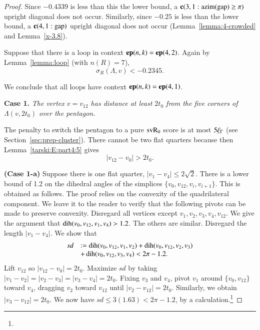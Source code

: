 \begin{proof}
Since $-0.4339$ is less than this the lower bound, a ${\operatorname{\bf c}}{(3,1: {\operatorname{azim}}({\operatorname{gap}}) \ge \pi)}$
upright diagonal does not occur. Similarly, since $-0.25$ is less
than the lower bound, a ${\operatorname{\bf c}}{(4,1:{\operatorname{gap}})}$ upright diagonal does not
occur (Lemma~\ref{lemma:4-crowded} and Lemma~\ref{x-3.8}).

Suppose that there is a loop in context ${\operatorname{\bf ep}}{(n,k)}={\operatorname{\bf ep}}{(4,2)}$. Again by
Lemma~\ref{lemma:loop} (with $n(R)=7$),
$$\sigma_R(\Lambda,v)  < -0.2345.$$


We conclude that all loops have context ${\operatorname{\bf ep}}{(n,k)}={\operatorname{\bf ep}}{(4,1)}$.


{\bf Case 1.}  {\it The vertex $v=v_{12}$ has distance at least
$2t_0$ from the five corners of $\Lambda(v,2t_0)$ over the pentagon.}


The penalty to switch the pentagon to a pure ${\operatorname{svR}}_0$ score is at
most $5\xi_\Gamma$ (see Section~\ref{sec:prep-cluster}).  There cannot
be two flat quarters because then Lemma~\ref{tarski:E:part4:5} gives
$$|v_{12}-v_0|>2t_0.$$


{\bf (Case 1-a)} Suppose there is one flat quarter,
$|v_1-v_4|\le2\sqrt2$. There is a lower bound of 1.2 on the
dihedral angles of the simplices $\{v_0,v_{12},v_i,v_{i+1}\}$.  This
is obtained as follows.  The proof relies on the convexity of the
quadrilateral component.  We leave it to the reader to verify that
the following pivots can be made to preserve convexity.  Disregard
all vertices except $v_1,v_2,v_3,v_4,v_{12}$.  We give the
argument that $\operatorname{dih}(v_0,v_{12},v_1,v_4)>1.2$.  The others are
similar. Disregard the length $|v_1-v_4|$.  We show that
    $$
    \begin{array}{lll}
        sd &:=\operatorname{dih}(v_0,v_{12},v_1,v_2)+\operatorname{dih}(v_0,v_{12},v_2,v_3)\\
           &+\operatorname{dih}(v_0,v_{12},v_3,v_4) < 2\pi-1.2.
    \end{array}
    $$
Lift $v_{12}$ so $|v_{12}-v_0|=2t_0$. Maximize $sd$ by taking
$|v_1-v_2|=|v_2-v_3|=|v_3-v_4|=2t_0$.  Fixing $v_3$ and $v_4$,
pivot $v_1$ around $\{v_0,v_{12}\}$ toward $v_4$, dragging $v_2$
toward $v_{12}$ until $|v_2-v_{12}|=2t_0$.  Similarly, we obtain
$|v_3-v_{12}|=2t_0$. We now have $sd\le 3(1.63)< 2\pi-1.2$, by a
calculation.\footnote{}


\end{proof}
